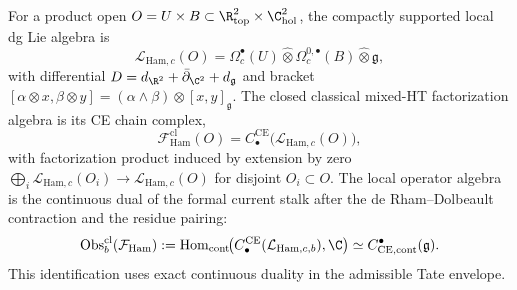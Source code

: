 \documentclass[11pt]{memoir}
\begin{document}
\begin{defn}\label{def:closed-mixed-HT-factorization}
  For a product open
  \(O=U\times B\subset\R^2_{\mathrm{top}}\times\C^2_{\mathrm{hol}}\),
  the compactly supported local dg Lie algebra is
  \[
    \mathcal L_{\mathrm{Ham},c}(O)
     =\Omega^\bullet_c(U)\widehat\otimes
       \Omega^{0,\bullet}_c(B)\widehat\otimes\mathfrak g,
  \]
  with differential \(D=d_{\R^2}+\bar\partial_{\C^2}+d_{\mathfrak g}\)
  and bracket
  \([\alpha\otimes x,\beta\otimes y]=
    (\alpha\wedge\beta)\otimes[x,y]_{\mathfrak g}\).  The closed
  classical mixed-HT factorization algebra is its CE chain complex,
  \[
    \mathcal F^{\mathrm{cl}}_{\mathrm{Ham}}(O)
      =C^{\mathrm{CE}}_\bullet\bigl(\mathcal L_{\mathrm{Ham},c}(O)\bigr),
  \]
	  with factorization product induced by extension by zero
	  \(\bigoplus_i\mathcal L_{\mathrm{Ham},c}(O_i)\to
	   \mathcal L_{\mathrm{Ham},c}(O)\) for disjoint \(O_i\subset O\).
	  The local operator algebra is the continuous dual of the formal
	  current stalk after the de Rham--Dolbeault contraction and the
	  residue pairing:
	  \[
	    \operatorname{Obs}^{\mathrm{cl}}_b(\mathcal F_{\mathrm{Ham}})
	    :=
	    \operatorname{Hom}_{\mathrm{cont}}\!
	    \bigl(C^{\mathrm{CE}}_\bullet(\mathcal L_{\mathrm{Ham},c,b}),\C\bigr)
	    \simeq
	    C^\bullet_{\mathrm{CE},\mathrm{cont}}(\mathfrak g).
	  \]
	  This identification uses exact continuous duality in the admissible
	  Tate envelope.
\end{defn}
\end{document}
